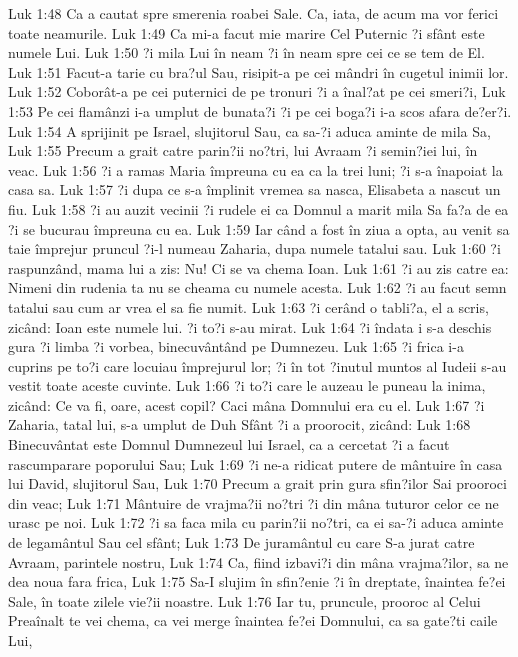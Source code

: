 Luk 1:48  Ca a cautat spre smerenia roabei Sale. Ca, iata, de acum ma vor ferici toate neamurile.
Luk 1:49  Ca mi-a facut mie marire Cel Puternic ?i sfânt este numele Lui.
Luk 1:50  ?i mila Lui în neam ?i în neam spre cei ce se tem de El.
Luk 1:51  Facut-a tarie cu bra?ul Sau, risipit-a pe cei mândri în cugetul inimii lor.
Luk 1:52  Coborât-a pe cei puternici de pe tronuri ?i a înal?at pe cei smeri?i,
Luk 1:53  Pe cei flamânzi i-a umplut de bunata?i ?i pe cei boga?i i-a scos afara de?er?i.
Luk 1:54  A sprijinit pe Israel, slujitorul Sau, ca sa-?i aduca aminte de mila Sa,
Luk 1:55  Precum a grait catre parin?ii no?tri, lui Avraam ?i semin?iei lui, în veac.
Luk 1:56  ?i a ramas Maria împreuna cu ea ca la trei luni; ?i s-a înapoiat la casa sa.
Luk 1:57  ?i dupa ce s-a împlinit vremea sa nasca, Elisabeta a nascut un fiu.
Luk 1:58  ?i au auzit vecinii ?i rudele ei ca Domnul a marit mila Sa fa?a de ea ?i se bucurau împreuna cu ea.
Luk 1:59  Iar când a fost în ziua a opta, au venit sa taie împrejur pruncul ?i-l numeau Zaharia, dupa numele tatalui sau.
Luk 1:60  ?i raspunzând, mama lui a zis: Nu! Ci se va chema Ioan.
Luk 1:61  ?i au zis catre ea: Nimeni din rudenia ta nu se cheama cu numele acesta.
Luk 1:62  ?i au facut semn tatalui sau cum ar vrea el sa fie numit.
Luk 1:63  ?i cerând o tabli?a, el a scris, zicând: Ioan este numele lui. ?i to?i s-au mirat.
Luk 1:64  ?i îndata i s-a deschis gura ?i limba ?i vorbea, binecuvântând pe Dumnezeu.
Luk 1:65  ?i frica i-a cuprins pe to?i care locuiau împrejurul lor; ?i în tot ?inutul muntos al Iudeii s-au vestit toate aceste cuvinte.
Luk 1:66  ?i to?i care le auzeau le puneau la inima, zicând: Ce va fi, oare, acest copil? Caci mâna Domnului era cu el.
Luk 1:67  ?i Zaharia, tatal lui, s-a umplut de Duh Sfânt ?i a proorocit, zicând:
Luk 1:68  Binecuvântat este Domnul Dumnezeul lui Israel, ca a cercetat ?i a facut rascumparare poporului Sau;
Luk 1:69  ?i ne-a ridicat putere de mântuire în casa lui David, slujitorul Sau,
Luk 1:70  Precum a grait prin gura sfin?ilor Sai prooroci din veac;
Luk 1:71  Mântuire de vrajma?ii no?tri ?i din mâna tuturor celor ce ne urasc pe noi.
Luk 1:72  ?i sa faca mila cu parin?ii no?tri, ca ei sa-?i aduca aminte de legamântul Sau cel sfânt;
Luk 1:73  De juramântul cu care S-a jurat catre Avraam, parintele nostru,
Luk 1:74  Ca, fiind izbavi?i din mâna vrajma?ilor, sa ne dea noua fara frica,
Luk 1:75  Sa-I slujim în sfin?enie ?i în dreptate, înaintea fe?ei Sale, în toate zilele vie?ii noastre.
Luk 1:76  Iar tu, pruncule, prooroc al Celui Preaînalt te vei chema, ca vei merge înaintea fe?ei Domnului, ca sa gate?ti caile Lui,
